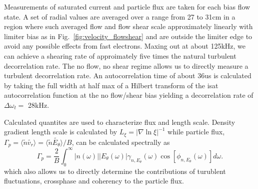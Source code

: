 \documentclass[%
 aps,
 prl,
 amsmath,amssymb,
 reprint,%
]{revtex4-1}
\begin{document}
Measurements of saturated current and particle flux are taken for each bias flow state. A set of radial values are averaged over a range from 27 to 31cm in a region where such averaged flow and flow shear scale approximately linearly with limiter bias as in 
Fig.~\ref{fig:velocity_flowshear}%
and are outside the limiter edge to avoid any possible effects from fast electrons. Maxing out at about 125kHz, we can achieve a shearing rate of approimately five times the natural turbulent decorrelation rate. The no flow, no shear regime allows us to directly measure a turbulent decorrelation rate. An autocorrelation time of about 36us is calculated by taking the full width at half max of a Hilbert transform of the isat autocorrelation function at the no flow/shear bias yielding a decorrelation rate of $\Delta \omega_{t} = $ 28kHz.

Calculated quantites are used to characterize flux and length scale. Density gradient length scale is calculated by $L_{\xi} = \lvert \nabla \ln \xi \rvert ^{-1}$ while particle flux, $\Gamma_{p} = \langle \tilde{n} \tilde{v_{r}} \rangle = \langle \tilde{n} \tilde{E_{\theta}} \rangle /B$, can be calculated spectrally as\cite{powers74}
\begin{equation}
\Gamma_{p} = \frac{2}{B} \int^{\infty}_{0} \lvert n(\omega) \rvert \lvert E_{\theta}(\omega) \rvert \gamma_{n,E_{\theta}}(\omega) \cos [\phi_{n,E_{\theta}}(\omega)] d\omega.
\label{eq:fluxint}
\end{equation}
which also allows us to directly determine the contributions of turublent fluctuations, crossphase and coherency to the particle flux.


\end{document}
